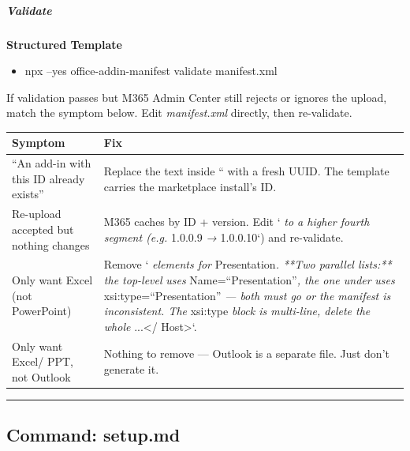 \documentclass[11pt]{article}
\begin{document}
\subparagraph{Validate}\mbox{}\par

\textbf{Structured Template}
\begin{itemize}[leftmargin=*,itemsep=2pt,topsep=2pt]
\item {} npx --yes office-addin-manifest validate manifest.xml
\end{itemize}

If validation passes but M365 Admin Center still rejects or ignores the upload, match the symptom below. Edit \emph{manifest.xml} directly, then re-validate.


\begingroup
\small
\setlength{\tabcolsep}{2pt}
\begin{longtable}{>{\RaggedRight\arraybackslash\hspace{0pt}}p{}>{\RaggedRight\arraybackslash\hspace{0pt}}p{}}
\toprule
{} \textbf{Symptom} & \textbf{Fix} \\
\midrule
{} ``An add-in with this ID already exists'' & Replace the text inside `` with a fresh UUID. The template carries the marketplace install's ID. \\
{} Re-upload accepted but nothing changes & M365 caches by ID + version. Edit `\emph{ to a higher fourth segment (e.g. }1.0.0.9\emph{ → }1.0.0.10`) and re-validate. \\
{} Only want Excel (not PowerPoint) & Remove `\emph{ elements for }Presentation\emph{. **Two parallel lists:** the top-level }\emph{ uses }Name=``Presentation''\emph{, the one under }\emph{ uses }xsi:type=``Presentation''\emph{ — both must go or the manifest is inconsistent. The }xsi:type\emph{ block is multi-line, delete the whole }...</ Host>`. \\
{} Only want Excel/ PPT, not Outlook & Nothing to remove — Outlook is a separate file. Just don't generate it. \\
\bottomrule
\end{longtable}
\endgroup

\vspace{0.8em}\hrule\vspace{0.8em}

\subsection{Command: setup.md}\label{file:commands-setup-md}
\end{document}
